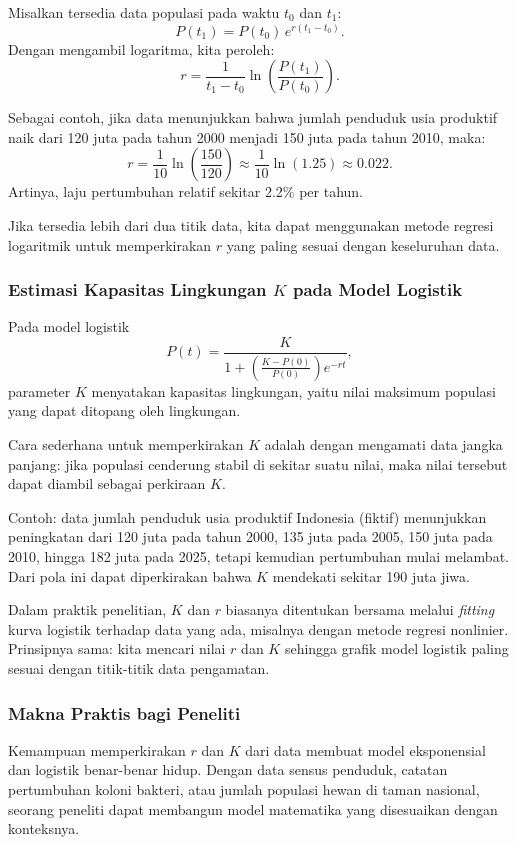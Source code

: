 \documentclass{bukumjh}
\begin{document}
Misalkan tersedia data populasi pada waktu $t_0$ dan $t_1$:
\[
P(t_1) = P(t_0)\, e^{r(t_1-t_0)}.
\]
Dengan mengambil logaritma, kita peroleh:
\[
r = \frac{1}{t_1-t_0} \ln \left(\frac{P(t_1)}{P(t_0)}\right).
\]

Sebagai contoh, jika data menunjukkan bahwa jumlah penduduk usia produktif naik dari 120 juta pada tahun 2000 menjadi 150 juta pada tahun 2010, maka:
\[
r = \frac{1}{10} \ln\left(\frac{150}{120}\right) 
   \approx \frac{1}{10} \ln(1.25) 
   \approx 0.022.
\]
Artinya, laju pertumbuhan relatif sekitar 2.2\% per tahun.

Jika tersedia lebih dari dua titik data, kita dapat menggunakan metode regresi logaritmik untuk memperkirakan $r$ yang paling sesuai dengan keseluruhan data.

\subsubsection*{Estimasi Kapasitas Lingkungan $K$ pada Model Logistik}

Pada model logistik
\[
P(t) = \frac{K}{1 + \left(\tfrac{K - P(0)}{P(0)}\right) e^{-rt}},
\]
parameter $K$ menyatakan kapasitas lingkungan, yaitu nilai maksimum populasi yang dapat ditopang oleh lingkungan.

Cara sederhana untuk memperkirakan $K$ adalah dengan mengamati data jangka panjang: jika populasi cenderung stabil di sekitar suatu nilai, maka nilai tersebut dapat diambil sebagai perkiraan $K$.  

Contoh: data jumlah penduduk usia produktif Indonesia (fiktif) menunjukkan peningkatan dari 120 juta pada tahun 2000, 135 juta pada 2005, 150 juta pada 2010, hingga 182 juta pada 2025, tetapi kemudian pertumbuhan mulai melambat. Dari pola ini dapat diperkirakan bahwa $K$ mendekati sekitar 190 juta jiwa.  

Dalam praktik penelitian, $K$ dan $r$ biasanya ditentukan bersama melalui \textit{fitting} kurva logistik terhadap data yang ada, misalnya dengan metode regresi nonlinier. Prinsipnya sama: kita mencari nilai $r$ dan $K$ sehingga grafik model logistik paling sesuai dengan titik-titik data pengamatan.

\subsubsection*{Makna Praktis bagi Peneliti}

Kemampuan memperkirakan $r$ dan $K$ dari data membuat model eksponensial dan logistik benar-benar hidup. Dengan data sensus penduduk, catatan pertumbuhan koloni bakteri, atau jumlah populasi hewan di taman nasional, seorang peneliti dapat membangun model matematika yang disesuaikan dengan konteksnya.  
\end{document}

